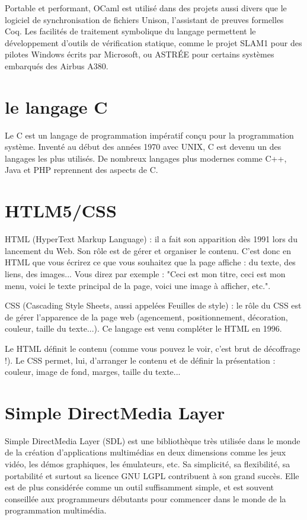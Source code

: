 \documentclass[12pt, a4paper]{report}
\begin{document}
\par Portable et performant, OCaml est utilisé dans des projets aussi divers que le logiciel de synchronisation de fichiers Unison, l'assistant de preuves formelles Coq. Les facilités de traitement symbolique du langage permettent le développement d'outils de vérification statique, comme le projet SLAM1 pour des pilotes Windows écrits par Microsoft, ou ASTRÉE pour certains systèmes embarqués des Airbus A380.

\newpage

\section {le langage C}
Le C est un langage de programmation impératif conçu pour la programmation système. Inventé au début des années 1970 avec UNIX, C est devenu un des langages les plus utilisés. De nombreux langages plus modernes comme C++, Java et PHP reprennent des aspects de C.

\section { HTLM5/CSS}
 \par  HTML (HyperText Markup Language) : il a fait son apparition dès 1991 lors du lancement du Web. Son rôle est de gérer et organiser le contenu. C'est donc en HTML que vous écrirez ce que vous souhaitez que la page affiche : du texte, des liens, des images... Vous direz par exemple : "Ceci est mon titre, ceci est mon menu, voici le texte principal de la page, voici une image à afficher, etc.".
 \par    CSS (Cascading Style Sheets, aussi appelées Feuilles de style) : le rôle du CSS est de gérer l'apparence de la page web (agencement, positionnement, décoration, couleur, taille du texte...). Ce langage est venu compléter le HTML en 1996.
\par Le HTML définit le contenu (comme vous pouvez le voir, c'est brut de décoffrage !). Le CSS permet, lui, d'arranger le contenu et de définir la présentation : couleur, image de fond, marges, taille du texte...

\newpage


\section {Simple DirectMedia Layer}

Simple DirectMedia Layer (SDL) est une bibliothèque très utilisée dans le monde de la création d'applications multimédias en deux dimensions comme les jeux vidéo, les démos graphiques, les émulateurs, etc. Sa simplicité, sa flexibilité, sa portabilité et surtout sa licence GNU LGPL contribuent à son grand succès. Elle est de plus considérée comme un outil suffisamment simple, et est souvent conseillée aux programmeurs débutants pour commencer dans le monde de la programmation multimédia.
\end{document}
